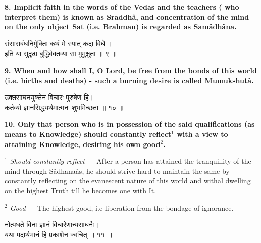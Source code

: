 \documentclass{article}
\begin{document}
\textbf{8. Implicit faith in the words of the Vedas and the teachers (
who interpret them) is known as Sraddhâ, and concentration of the mind on the
only object Sat (i.e. Brahman) is regarded as Samâdhâna.
}

\begin{large}
\begin{center}
    \begin{hindi}
	संसाराबंधनिर्मुक्तिः कथं मे स्यात् कदा विधे ।\\
	इति या सु्दृढा बुद्धिर्वक्तव्या सा मुमुक्षुता ॥ ९ ॥
    \end{hindi}
\end{center}
\end{large}

\textbf{9. When and how shall I, O Lord, be free from the bonds of this world
(i.e. births and deaths) - such a burning desire is called Mumukshutâ.
}

\bigskip

\begin{large}
\begin{center}
    \begin{hindi}
	उक्तसाघनयुक्तेन विचारः पुरुषेण हि।\\
	कर्तव्यो ज्ञानसिद्धयर्थमात्मनः शुभमिच्छता ॥ १० ॥
    \end{hindi}
\end{center}
\end{large}

\textbf{ 10. Only that person who is in possession of the said qualifications
(as means to Knowledge) should constantly reflect$^1$ with a view to attaining
Knowledge, desiring his own good$^2$.
}

{\small\textit{$^1$ Should constantly reflect} --- After a person has
attained the tranquillity of the mind through Sâdhanaâs, he should strive hard
to maintain the same by constantly reflecting on the evanescent nature of this
world and withal dwelling on the highest Truth till he becomes one with It.}

{\small\textit{$^2$ Good} --- The highest good, i.e liberation from the bondage
of ignorance.}

\bigskip

\begin{large}
\begin{center}
    \begin{hindi}

	नोत्पधते विना ज्ञानं  विचारेणान्यसाधनैः।\\
    यथा पदार्थभानं हि प्रकाशेन क्वचित् ॥ ११  ॥

    \end{hindi}
\end{center}
\end{large}
\end{document}
